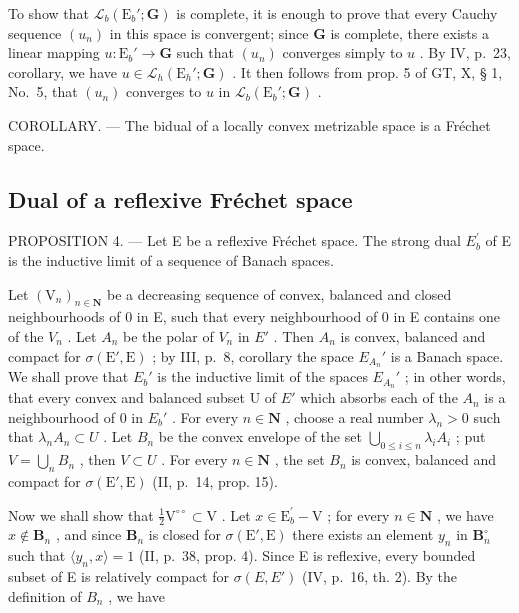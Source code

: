 To show that \(\mathcal{L}_b(\mathrm{E}_b';\mathbf{G})\) is complete, it is enough to prove that every Cauchy sequence \((u_n)\) in this space is convergent; since \(\mathbf{G}\) is complete, there exists a linear mapping \(u:\mathrm{E}_b' \to \mathbf{G}\) such that \((u_n)\) converges simply to \(u\) . By IV, p.~23, corollary, we have \(u \in \mathcal{L}_h(\mathrm{E}_h';\mathbf{G})\) . It then follows from prop. 5 of GT, X, § 1, No.~5, that \((u_n)\) converges to \(u\) in \(\mathcal{L}_b(\mathrm{E}_b';\mathbf{G})\) .

COROLLARY. --- The bidual of a locally convex metrizable space is a Fréchet space.

\subsection{Dual of a reflexive Fréchet space}

PROPOSITION 4. --- Let E be a reflexive Fréchet space. The strong dual \(E_{b}^{\prime}\) of E is the inductive limit of a sequence of Banach spaces.

Let \((\mathrm{V}_{n})_{n\in\mathbf{N}}\) be a decreasing sequence of convex, balanced and closed neighbourhoods of 0 in E, such that every neighbourhood of 0 in E contains one of the \(V_{n}\) . Let \(A_{n}\) be the polar of \(V_{n}\) in \(E'\) . Then \(A_{n}\) is convex, balanced and compact for \(\sigma(\mathrm{E}',\mathrm{E})\) ; by III, p.~8, corollary the space \(E_{A_{n}}'\) is a Banach space. We shall prove that \(E_{b}'\) is the inductive limit of the spaces \(E_{A_{n}}'\) ; in other words, that every convex and balanced subset U of \(E'\) which absorbs each of the \(A_{n}\) is a neighbourhood of 0 in \(E_{b}'\) . For every \(n\in\mathbf{N}\) , choose a real number \(\lambda_{n}>0\) such that \(\lambda_{n}A_{n}\subset U\) . Let \(B_{n}\) be the convex envelope of the set \(\bigcup_{0\leqslant i\leqslant n}\lambda_{i}A_{i}\) ; put \(V=\bigcup_{n}B_{n}\) , then \(V\subset U\) . For every \(n\in\mathbf{N}\) , the set \(B_{n}\) is convex, balanced and compact for \(\sigma(\mathrm{E}',\mathrm{E})\) (II, p.~14, prop. 15).

Now we shall show that \(\frac{1}{2}\mathrm{V}^{\circ \circ}\subset \mathrm{V}\) . Let \(x\in \mathrm{E}_b^\prime -\mathrm{V}\) ; for every \(n\in \mathbf{N}\) , we have \(x\notin \mathbf{B}_n\) , and since \(\mathbf{B}_n\) is closed for \(\sigma (\mathrm{E}',\mathrm{E})\) there exists an element \(y_{n}\) in \(\mathbf{B}_n^\circ\) such that \(\langle y_n, x \rangle = 1\) (II, p.~38, prop. 4). Since E is reflexive, every bounded subset of E is relatively compact for \(\sigma(E, E')\) (IV, p.~16, th. 2). By the definition of \(B_n\) , we have

